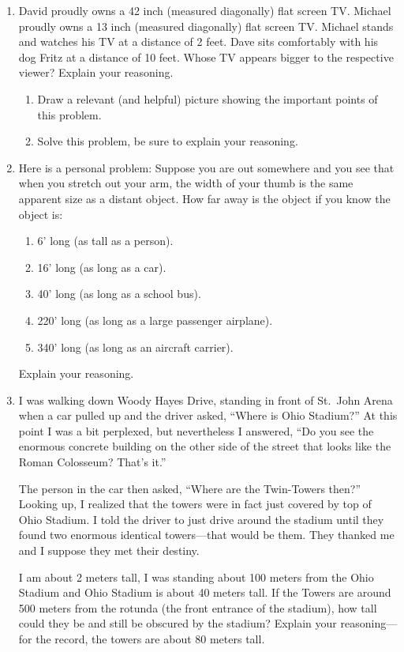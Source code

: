 \begin{enumerate}
\item David proudly owns a 42 inch (measured diagonally) flat screen
  TV. Michael proudly owns a 13 inch (measured diagonally) flat screen
  TV. Michael stands and watches his TV at a distance of 2 feet. Dave
  sits comfortably with his dog Fritz at a distance of 10 feet. Whose
  TV appears bigger to the respective viewer? Explain your reasoning.
\begin{enumerate}
\item Draw a relevant (and helpful) picture showing the important
  points of this problem.
\item Solve this problem, be sure to explain your reasoning.
\end{enumerate}

\item Here is a personal problem: Suppose you are out somewhere and
  you see that when you stretch out your arm, the width of your thumb
  is the same apparent size as a distant object. How far away is the
  object if you know the object is:
\begin{enumerate}
\item 6' long (as tall as a person).
\item 16' long (as long as a car).
\item 40' long (as long as a school bus).
\item 220' long (as long as a large passenger airplane).
\item 340' long (as long as an aircraft carrier).
\end{enumerate}
Explain your reasoning.

\item I was walking down Woody Hayes Drive, standing in front of
  St.\ John Arena when a car pulled up and the driver asked, ``Where
  is Ohio Stadium?'' At this point I was a bit perplexed, but
  nevertheless I answered, ``Do you see the enormous concrete building
  on the other side of the street that looks like the Roman Colosseum?
  That's it.''
 
The person in the car then asked, ``Where are the Twin-Towers then?''
Looking up, I realized that the towers were in fact just covered by
top of Ohio Stadium. I told the driver to just drive around the
stadium until they found two enormous identical towers---that would be
them. They thanked me and I suppose they met their destiny.

I am about 2 meters tall, I was standing about 100 meters from the
Ohio Stadium and Ohio Stadium is about 40 meters tall. If the Towers
are around 500 meters from the rotunda (the front entrance of the
stadium), how tall could they be and still be obscured by the stadium?
Explain your reasoning---for the record, the towers are about 80
meters tall.



\end{enumerate}
